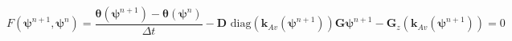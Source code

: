\begin{equation}
\label{eq:richards-mixed-discrete-time}
    F(\boldsymbol{\psi}^{n+1},\boldsymbol{\psi}^n) = \frac{
    \boldsymbol{\theta}(\boldsymbol{\psi}^{n+1}) - \boldsymbol{\theta}(\boldsymbol{\psi}^n)
    }{\Delta t}
    - \mathbf{D}
        \text{ diag}
        \left(
            \mathbf{k}_{Av}(\boldsymbol{\psi}^{n+1})
        \right)
    \mathbf{G} \boldsymbol{\psi}^{n+1}
    - \mathbf{G}_z
        \left(
            \mathbf{k}_{Av}(\boldsymbol{\psi}^{n+1})
        \right)
    =
    0
\end{equation}
